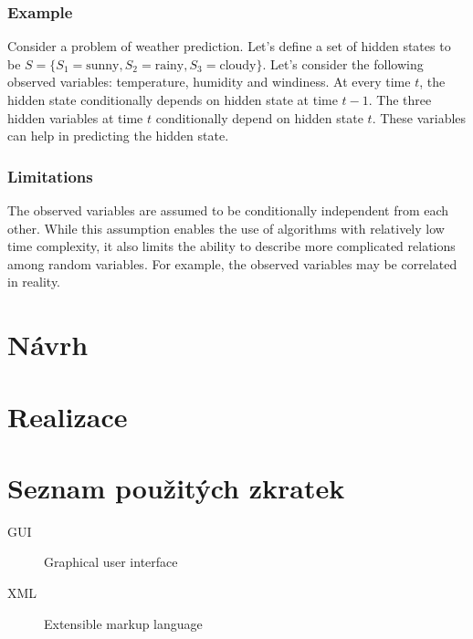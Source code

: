 \documentclass[thesis=B,english]{FITthesis}[2012/06/26]
\begin{document}
\subsection{Example}

Consider a problem of weather prediction. Let's define a set of hidden states to be $S = \{S_1 = \text{sunny}, S_2 = \text{rainy}, S_3 = \text{cloudy} \}$. Let's consider the following observed variables: temperature, humidity and windiness. At every time $t$, the hidden state conditionally depends on hidden state at time $t-1$. The three hidden variables at time $t$ conditionally depend on hidden state $t$. These variables can help in predicting the hidden state.

\subsection{Limitations}

The observed variables are assumed to be conditionally independent from each other. While this assumption enables the use of algorithms with relatively low time complexity, it also limits the ability to describe more complicated relations among random variables. For example, the observed variables may be correlated in reality.

\chapter{Návrh}

\chapter{Realizace}

\begin{conclusion}
\end{conclusion}




\appendix

\chapter{Seznam použitých zkratek}
\begin{description}
	\item[GUI] Graphical user interface
	\item[XML] Extensible markup language
\end{description}
\end{document}
